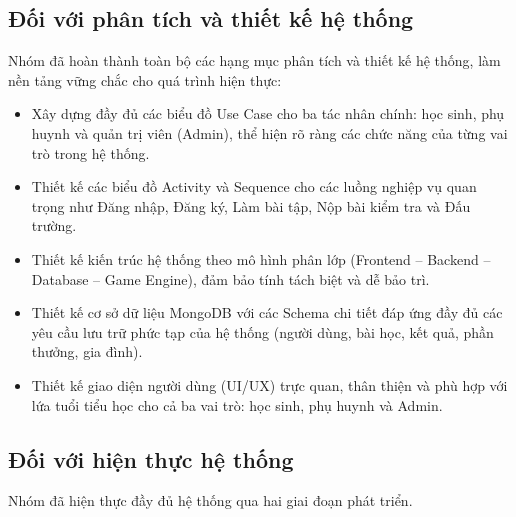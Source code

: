 \subsection{Đối với phân tích và thiết kế hệ thống}
Nhóm đã hoàn thành toàn bộ các hạng mục phân tích và thiết kế hệ thống, làm nền tảng vững chắc cho quá trình hiện thực:
\begin{itemize}
	\item Xây dựng đầy đủ các biểu đồ Use Case cho ba tác nhân chính: học sinh, phụ huynh và quản trị viên (Admin), thể hiện rõ ràng các chức năng của từng vai trò trong hệ thống.
	\item Thiết kế các biểu đồ Activity và Sequence cho các luồng nghiệp vụ quan trọng như Đăng nhập, Đăng ký, Làm bài tập, Nộp bài kiểm tra và Đấu trường.
	\item Thiết kế kiến trúc hệ thống theo mô hình phân lớp (Frontend -- Backend -- Database -- Game Engine), đảm bảo tính tách biệt và dễ bảo trì.
	\item Thiết kế cơ sở dữ liệu MongoDB với các Schema chi tiết đáp ứng đầy đủ các yêu cầu lưu trữ phức tạp của hệ thống (người dùng, bài học, kết quả, phần thưởng, gia đình).
	\item Thiết kế giao diện người dùng (UI/UX) trực quan, thân thiện và phù hợp với lứa tuổi tiểu học cho cả ba vai trò: học sinh, phụ huynh và Admin.
\end{itemize}

\subsection{Đối với hiện thực hệ thống}
Nhóm đã hiện thực đầy đủ hệ thống qua hai giai đoạn phát triển.

